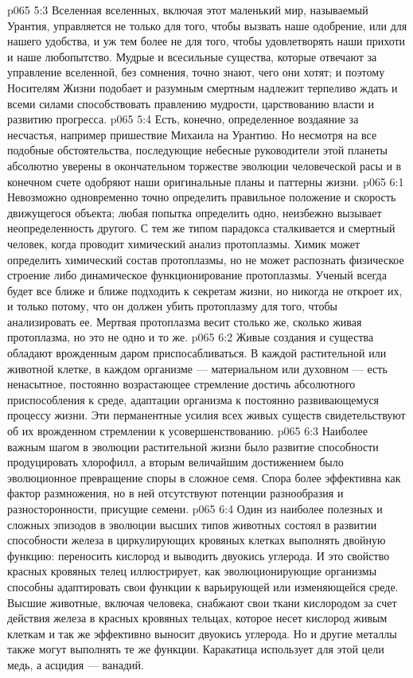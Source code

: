 \vs p065 5:3 Вселенная вселенных, включая этот маленький мир, называемый Урантия, управляется не только для того, чтобы вызвать наше одобрение, или для нашего удобства, и уж тем более не для того, чтобы удовлетворять наши прихоти и наше любопытство. Мудрые и всесильные существа, которые отвечают за управление вселенной, без сомнения, точно знают, чего они хотят; и поэтому Носителям Жизни подобает и разумным смертным надлежит терпеливо ждать и всеми силами способствовать правлению мудрости, царствованию власти и развитию прогресса.
\vs p065 5:4 Есть, конечно, определенное воздаяние за несчастья, например пришествие Михаила на Урантию. Но несмотря на все подобные обстоятельства, последующие небесные руководители этой планеты абсолютно уверены в окончательном торжестве эволюции человеческой расы и в конечном счете одобряют наши оригинальные планы и паттерны жизни.
\vs p065 6:1 Невозможно одновременно точно определить правильное положение и скорость движущегося объекта; любая попытка определить одно, неизбежно вызывает неопределенность другого. С тем же типом парадокса сталкивается и смертный человек, когда проводит химический анализ протоплазмы. Химик может определить химический состав  протоплазмы, но не может распознать физическое строение либо динамическое функционирование  протоплазмы. Ученый всегда будет все ближе и ближе подходить к секретам жизни, но никогда не откроет их, и только потому, что он должен убить протоплазму для того, чтобы анализировать ее. Мертвая протоплазма весит столько же, сколько живая протоплазма, но это не одно и то же.
\vs p065 6:2 \pc Живые создания и существа обладают врожденным даром приспосабливаться. В каждой  растительной или животной клетке, в каждом  организме --- материальном или духовном --- есть ненасытное, постоянно возрастающее стремление достичь абсолютного приспособления к среде, адаптации организма к постоянно развивающемуся процессу жизни. Эти перманентные усилия всех живых существ свидетельствуют об их врожденном стремлении к усовершенствованию.
\vs p065 6:3 Наиболее важным шагом в эволюции растительной жизни было развитие способности продуцировать хлорофилл, а вторым величайшим достижением было эволюционное превращение споры в сложное семя. Спора более эффективна как фактор размножения, но в ней отсутствуют потенции разнообразия и разносторонности, присущие семени.
\vs p065 6:4 Один из наиболее полезных и сложных эпизодов в эволюции высших типов животных состоял в развитии способности железа в циркулирующих кровяных клетках выполнять двойную функцию: переносить кислород и выводить двуокись углерода. И это свойство красных кровяных телец иллюстрирует, как эволюционирующие организмы способны адаптировать свои функции к варьирующей или изменяющейся среде. Высшие животные, включая человека, снабжают свои ткани кислородом за счет действия железа в красных кровяных тельцах, которое несет кислород живым клеткам и так же эффективно выносит двуокись углерода. Но и другие металлы также могут выполнять те же функции. Каракатица использует для этой цели медь, а асцидия --- ванадий.

